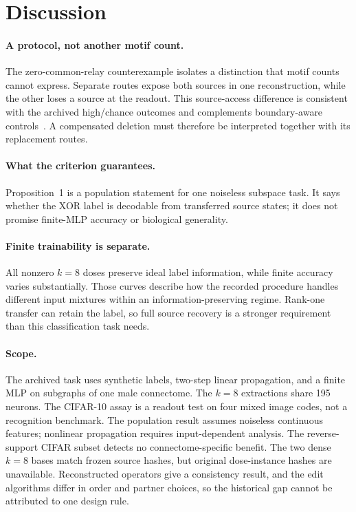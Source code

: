 \section{Discussion}
\label{sec:discussion}

\paragraph{A protocol, not another motif count.}
The zero-common-relay counterexample isolates a distinction that motif
counts cannot express. Separate routes expose both sources in one
reconstruction, while the other loses a source at the readout. This
source-access difference is consistent with the archived high/chance
outcomes and complements boundary-aware controls~\cite{park2026}. A
compensated deletion must therefore be interpreted together with its
replacement routes.

\paragraph{What the criterion guarantees.}
Proposition~1 is a population statement for one noiseless subspace task.
It says whether the XOR label is decodable from transferred source states;
it does not promise finite-MLP accuracy or biological generality.

\paragraph{Finite trainability is separate.}
All nonzero $k=8$ doses preserve ideal label information, while finite
accuracy varies substantially. Those curves describe how the recorded
procedure handles different input mixtures within an information-preserving
regime. Rank-one transfer can retain the label, so full source recovery is a
stronger requirement than this classification task needs.

\paragraph{Scope.}
The archived task uses synthetic labels, two-step linear propagation, and a
finite MLP on subgraphs of one male connectome. The $k=8$ extractions share
195 neurons. The CIFAR-10 assay is a readout test on four mixed image codes,
not a recognition benchmark. The population result assumes noiseless
continuous features; nonlinear propagation requires input-dependent
analysis. The reverse-support CIFAR subset detects no connectome-specific
benefit. The two dense $k=8$ bases match frozen source hashes, but original
dose-instance hashes are unavailable. Reconstructed operators give a
consistency result, and the edit algorithms differ in order and partner
choices, so the historical gap cannot be attributed to one design rule.

